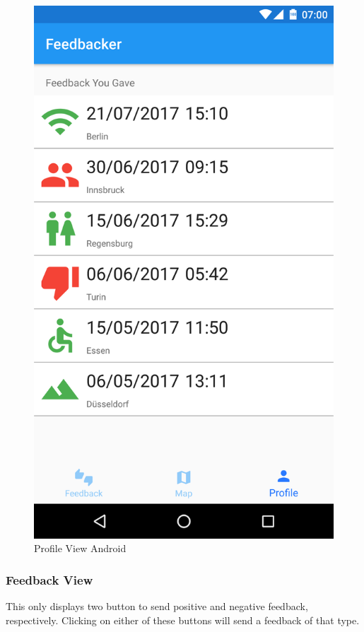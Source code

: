 \begin{figure}[H]
  \includegraphics[width=\linewidth]{bilder/Screenshot_Profile.png}
  \caption{Profile View Android}\label{fig_profile}
\endminipage
\end{figure}

\subsubsection{Feedback View} \label{ssec:send}
This only displays two button to send positive and negative feedback, respectively. Clicking on either of these buttons will send a feedback of that type.


